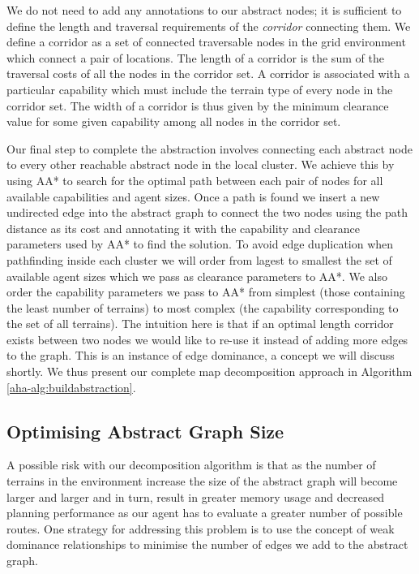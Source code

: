 {We do not need to add any annotations to our abstract nodes; it is sufficient to define the length and traversal requirements of the \emph{corridor} connecting them. We define a corridor as a set of connected traversable nodes in the grid environment which connect a pair of locations. The length of a corridor is the sum of the traversal costs of all the nodes in the corridor set. A corridor is associated with a particular capability which must include the terrain type of every node in the corridor set. 
The width of a corridor is thus given by the minimum clearance value for some given capability among all nodes in the corridor set. 
\par \indent
Our final step to complete the abstraction involves connecting each abstract node to every other reachable abstract node in the local cluster. 
We achieve this by using AA* to search for the optimal path between each pair of nodes for all available capabilities and agent sizes. 
Once a path is found we insert a new undirected edge into the abstract graph to connect the two nodes using the path distance as its cost and annotating it with the capability and clearance parameters used by AA* to find the solution. 
To avoid edge duplication when pathfinding inside each  cluster we will order from lagest to smallest the set of available agent sizes which we pass as clearance parameters to AA*. 
We also order the capability parameters we pass to AA* from simplest (those containing the least number of terrains) to most complex (the capability corresponding to the set of all terrains). 
The intuition here is that if an optimal length corridor exists between two nodes we would like to re-use it instead of adding more edges to the graph. This is an instance of edge dominance, a concept we will discuss shortly.
We thus present our complete map decomposition approach in  Algorithm \ref{aha-alg:buildabstraction}.



\subsection{Optimising Abstract Graph Size}
A possible risk with our decomposition algorithm is that as the number of terrains in the environment increase the size of the abstract graph will become larger and larger and in turn, result in greater memory usage and decreased planning performance as our agent has to evaluate a greater number of possible routes.
One strategy for addressing this problem is to use the concept of weak dominance relationships to minimise the number of edges we add to the abstract graph. 

}
